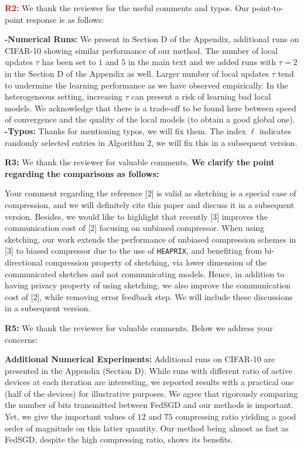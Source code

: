 \documentclass{article}
\begin{document}
\textbf{\textcolor{red}{R2:}} We thank the reviewer for the useful comments and typos. Our point-to-point response is as follows:\vspace{-5pt}

\textbf{-Numerical Runs:} We present in Section D of the Appendix, additional runs on CIFAR-10 showing similar performance of our method. The number of local updates $\tau$ has been set to $1$ and $5$ in the main text and we added runs with $\tau = 2$ in the Section D of the Appendix as well. Larger number of local updates $\tau$ tend to undermine the learning performance as we have observed empirically. In the heterogeneous setting, increasing $\tau$ can present a risk of learning bad local models. We acknowledge that there is a trade-off to be found here between speed of convergence and the quality of the local models (to obtain a good global one). \textbf{-Typos:} Thanks for mentioning typos, we will fix them. The index $\ell$ indicates randomly selected entries in Algorithm 2, we will fix this in a subsequent version.  


\textbf{\textcolor{yellow!50!black}{R3:}} We thank the reviewer for valuable comments. \textbf{We clarify the point regarding the comparisons as follows:}\vspace{-5pt}

 Your comment regarding the reference [2] is valid as sketching is a special case of compression, and we will definitely cite this paper and discuss it in a subsequent version. Besides, we would like to highlight that recently [3] improves the communication cost of [2] focusing on unbiased compressor. 
When using sketching, our work extends the performance of unbiased compression schemes in [3] to biased compressor \textcolor{red!50!black}{due to the use of \texttt{HEAPRIX}, and benefiting from bi-directional compression property of sketching, via lower dimension of the communicated sketches and not communicating models}.  
Hence, in addition to having privacy property of using sketching, we also improve the communication cost of [2], while \textcolor{red!50!black}{removing error feedback step}. We will include these discussions in a subsequent version.    



\textbf{\textcolor{green!50!black}{R5:}} We thank the reviewer for valuable comments. Below we address your concerns:\vspace{-5pt}

\textbf{Additional Numerical Experiments:} Additional runs on CIFAR-10 are presented in the Appendix (Section D). While runs with different ratio of active devices at each iteration are interesting, we reported results with a practical one (half of the devices) for illustrative purposes.
We agree that rigorously comparing the number of bits transmitted between FedSGD and our methods is important.
Yet, we give the important values of $12$ and $75$ compressing ratio yielding a good order of magnitude on this latter quantity. 
Our method being almost as fast as FedSGD, despite the high compressing ratio, shows its benefits.
\end{document}
